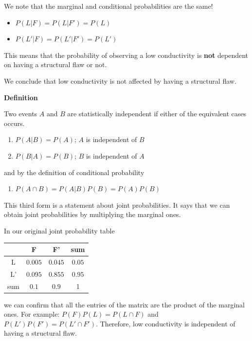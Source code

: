 \documentclass[
]{book}
\providecommand{\tightlist}{%
  \setlength{\itemsep}{0pt}\setlength{\parskip}{0pt}}
\begin{document}
We note that the marginal and conditional probabilities are the same!

\begin{itemize}
\tightlist
\item
  \(P(L| F)= P(L|F')=P(L)\)
\item
  \(P(L'| F)= P(L'|F')=P(L')\)
\end{itemize}

This means that the probability of observing a low conductivity is \textbf{not} dependent on having a structural flaw or not.

We conclude that low conductivity is not affected by having a structural flaw.

\textbf{Definition}

Two events \(A\) and \(B\) are statistically independent if either of the equivalent cases occurs.

\begin{enumerate}
\def\labelenumi{\arabic{enumi})}
\tightlist
\item
  \(P(A| B)= P(A)\); \(A\) is independent of \(B\)
\item
  \(P(B| A)= P(B)\); \(B\) is independent of \(A\)
\end{enumerate}

and by the definition of conditional probability

\begin{enumerate}
\def\labelenumi{\arabic{enumi})}
\setcounter{enumi}{2}
\tightlist
\item
  \(P(A\cap B)=P(A|B)P(B)=P(A)P(B)\)
\end{enumerate}

This third form is a statement about joint probabilities. It says that we can obtain joint probabilities by multiplying the marginal ones.

In our original joint probability table

\begin{longtable}[]{@{}cccc@{}}
\toprule\noalign{}
& F & F' & sum \\
\midrule\noalign{}
\endhead
\bottomrule\noalign{}
\endlastfoot
L & \(0.005\) & \(0.045\) & \(0.05\) \\
L' & \(0.095\) & \(0.855\) & \(0.95\) \\
sum & \(0.1\) & \(0.9\) & 1 \\
\end{longtable}

we can confirm that all the entries of the matrix are the product of the marginal ones. For example: \(P(F)P(L)= P( L \cap F)\) and \(P(L')P(F')=P(L' \cap F')\). Therefore, low conductivity is independent of having a structural flaw.
\end{document}
